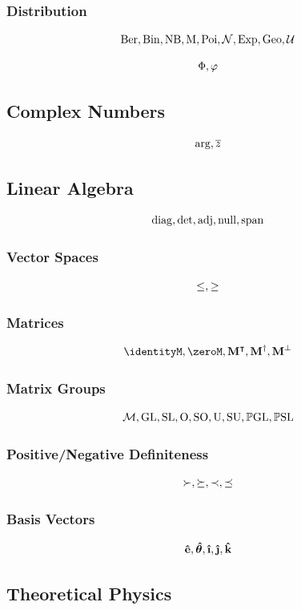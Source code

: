 \documentclass{article}
\begin{document}
\subsubsection{Distribution}
\[
    \operatorname{Ber}, \operatorname{Bin}, \operatorname{NB}, \operatorname{M}, \operatorname{Poi}, \operatorname{\mathcal{N}}, \operatorname{Exp}, \operatorname{Geo}, \operatorname{\mathcal{U}}
\]

\[
    \Phi, \varphi
\]

\subsection{Complex Numbers}
\[
    \arg, \overline{z}
\]

\subsection{Linear Algebra}
\[
    \operatorname{diag}, \det, \operatorname{adj}, \operatorname{null}, \operatorname{span}
\]

\subsubsection{Vector Spaces}
\[
    \leq, \geq
\]

\subsubsection{Matrices}
\[
    \identityM, \zeroM, \vb{M}\transpose, \vb{M}\hermitian, \vb{M}\perppl
\]

\subsubsection{Matrix Groups}
\[
    \mathcal{M}, \operatorname{GL}, \operatorname{SL}, \operatorname{O}, \operatorname{SO}, \operatorname{U}, \operatorname{SU}, \mathbb{P}\mathrm{GL}, \mathbb{P}\mathrm{SL}
\]

\subsubsection{Positive/Negative Definiteness}
\[
    \succ, \succeq, \prec, \preceq
\]

\subsubsection{Basis Vectors}
\[
    \unitv{e}, \unitv*{\theta}, \ihat, \jhat, \khat
\]

\subsection{Theoretical Physics}
\end{document}

